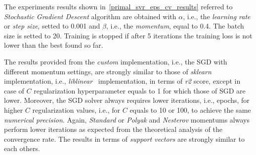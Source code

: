 The experiments results shown in~\ref{primal_svr_eps_cv_results} referred to \emph{Stochastic Gradient Descent} algorithm are obtained with $\alpha$, i.e., the \emph{learning rate} or \emph{step size}, setted to 0.001 and $\beta$, i.e., the \emph{momentum}, equal to 0.4. The batch size is setted to 20. Training is stopped if after 5 iterations the training loss is not lower than the best found so far.



The results provided from the \emph{custom} implementation, i.e., the SGD with different momentum settings, are strongly similar to those of \emph{sklearn} implementation, i.e., \emph{liblinear}~\cite{fan2008liblinear} implementation, in terms of \emph{r2} score, except in case of $C$ regularization hyperparameter equals to 1 for which those of SGD are lower. Moreover, the SGD solver always requires lower iterations, i.e., epochs, for higher $C$ regularization values, i.e., for $C$ equals to 10 or 100, to achieve the same \emph{numerical precision}. Again, \emph{Standard} or \emph{Polyak} and \emph{Nesterov} momentums always perform lower iterations as expected from the theoretical analysis of the convergence rate. The results in terms of \emph{support vectors} are strongly similar to each others.

